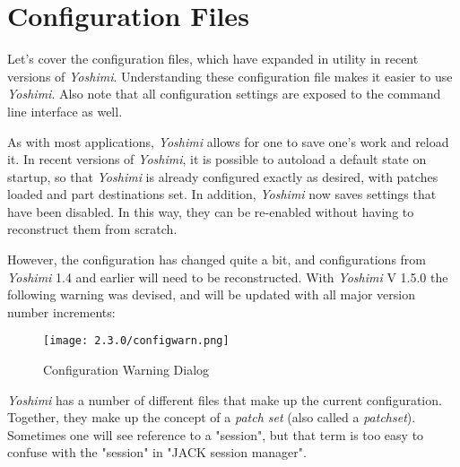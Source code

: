 %
%
%

\section{Configuration Files}
\label{sec:configuration}

   Let's cover the configuration files, which have expanded in utility in
   recent versions of \textsl{Yoshimi}.
   Understanding these configuration file makes it easier to
   use \textsl{Yoshimi}.
   Also note that all configuration settings are exposed to the command line
   interface as well.

   As with most applications, \textsl{Yoshimi} allows for one to save one's
   work and reload it. In recent versions of \textsl{Yoshimi}, it is possible
   to autoload a default state on startup, so that \textsl{Yoshimi} is
   already configured exactly as desired, with patches loaded and part
   destinations set.
   In addition, \textsl{Yoshimi} now saves settings that have been disabled.
   In this way, they can be re-enabled without having to reconstruct them from
   scratch.

   However, the configuration has changed quite a bit, and configurations from
   \textsl{Yoshimi} 1.4 and earlier will need to be reconstructed. With
   \textsl{Yoshimi} V 1.5.0 the following warning was devised, and will be updated
   with all major version number increments:

\begin{figure}[H]
   \centering
   \texttt{[image: 2.3.0/configwarn.png]}
   \caption{Configuration Warning Dialog}
   \label{fig:config_warn_dialog}
\end{figure}

   \textsl{Yoshimi} has a number of different files that make up the current
   configuration.
   Together, they make up the concept of a \textsl{patch set} (also called a
   \textsl{patchset}).
   Sometimes one will see reference to a "session", but that term is too easy
   to confuse with the "session" in "JACK session manager".


